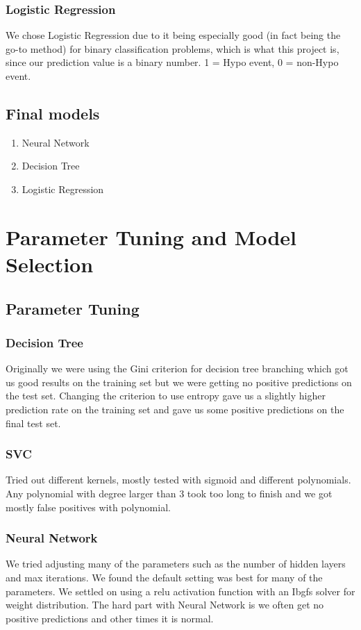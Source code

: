 \documentclass[11pt,a4paper]{article}
\begin{document}
		\subsubsection{Logistic Regression}
			We chose Logistic Regression due to it being especially good (in fact being the go-to method) for binary classification problems, which is what this project is, since our prediction value is a binary number. 1 = Hypo event, 0 = non-Hypo event.

	\subsection{Final models}
		\begin{enumerate}
			\item Neural Network
			\item Decision Tree
			\item Logistic Regression
		\end{enumerate}

\section{Parameter Tuning and Model Selection }
	\subsection{Parameter Tuning}

		\subsubsection{Decision Tree}
			Originally we were using the Gini criterion for decision tree branching which got us good results on the training set but we were getting no positive predictions on the test set.
			Changing the criterion to use entropy gave us a slightly higher prediction rate on the training set and gave us some positive predictions on the final test set.

		\subsubsection{SVC}
			Tried out different kernels, mostly tested with sigmoid and different polynomials.
			Any polynomial with degree larger than 3 took too long to finish and we got mostly false positives with polynomial.

		\subsubsection{Neural Network}
			We tried adjusting many of the parameters such as the number of hidden layers and max iterations.
			We found the default setting was best for many of the parameters.
			We settled on using a relu activation function with an Ibgfs solver for weight distribution.
			The hard part with Neural Network is we often get no positive predictions and other times it is normal.
\end{document}
